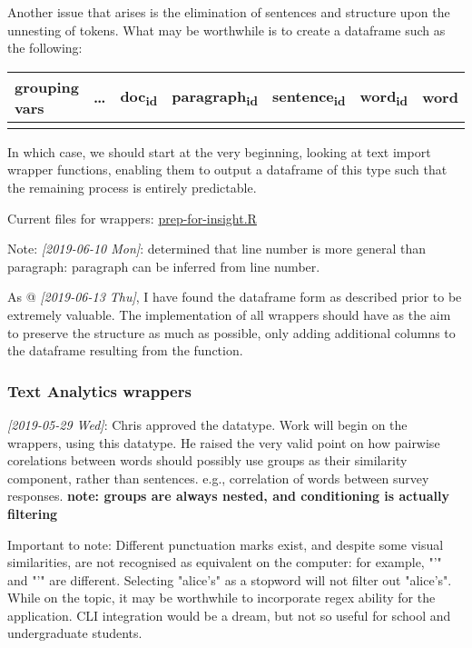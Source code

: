 \documentclass[a4paper, 11pt]{article}
\begin{document}
Another issue that arises is the elimination of sentences and
structure upon the unnesting of tokens. What may be worthwhile is to
create a dataframe such as the following:

\begin{center}
\begin{tabular}{lllllll}
grouping vars & \ldots{} & doc\textsubscript{id} & paragraph\textsubscript{id} & sentence\textsubscript{id} & word\textsubscript{id} & word\\
\hline
 &  &  &  &  &  & \\
\end{tabular}
\end{center}

In which case, we should start at the very beginning, looking at text
import wrapper functions, enabling them to output a dataframe of this
type such that the remaining process is entirely predictable.

Current files for wrappers:
\href{file:///home/user/curr/stats-781/src/prep-for-insight.R}{prep-for-insight.R}

Note: \textit{[2019-06-10 Mon]}: determined that line number is more general
than paragraph: paragraph can be inferred from line number.

As @ \textit{[2019-06-13 Thu]}, I have found the dataframe form as described
prior to be extremely valuable. The implementation of all wrappers
should have as the aim to preserve the structure as much as possible,
only adding additional columns to the dataframe resulting from the
function.
\subsubsection{Text Analytics wrappers}
\label{sec:org842682e}
\textit{[2019-05-29 Wed]}: Chris approved the datatype. Work will begin on the
wrappers, using this datatype. He raised the very valid point on how
pairwise corelations between words should possibly use groups as
their similarity component, rather than sentences. e.g., correlation
of words between survey responses. \textbf{note: groups are always nested,
and conditioning is actually filtering}

Important to note: Different punctuation marks exist, and despite some
visual similarities, are not recognised as equivalent on the computer:
for example, "’" and "'" are different. Selecting "alice's" as a
stopword will not filter out "alice’s". While on the topic, it may be
worthwhile to incorporate regex ability for the application. CLI
integration would be a dream, but not so useful for school and
undergraduate students.
\end{document}
